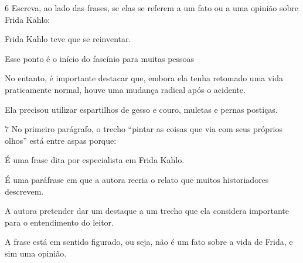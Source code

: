 \num{6} Escreva, ao lado das frases, se elas se referem a um fato ou a
uma opinião sobre Frida Kahlo:

\begin{escolha}
\item Frida Kahlo teve que se reinventar. 
\item Esse ponto é o início do fascínio para muitas
pessoas 
\item No entanto, é importante destacar que, embora ela tenha retomado
uma vida praticamente normal, houve uma mudança radical após o
acidente. 
\item Ela precisou utilizar espartilhos de gesso e couro, muletas e
pernas postiças. 
\end{escolha}

\num{7} No primeiro parágrafo, o trecho ``pintar as coisas que via com
seus próprios olhos'' está entre aspas porque:

\begin{escolha}
\item É uma frase dita por especialista em Frida Kahlo.
\item É uma paráfrase em que a autora recria o relato que muitos
historiadores descrevem. 
\item A autora pretender dar um destaque a um trecho que ela considera
importante para o entendimento do leitor.
\item A frase está em sentido figurado, ou seja, não é um fato sobre a vida
de Frida, e sim uma opinião.
\end{escolha}


